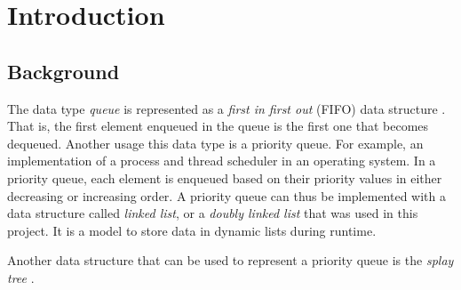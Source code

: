 \documentclass[a4paper,11pt]{kth-mag}
\begin{document}
\chapter{Introduction}

\section{Background}
The data type \emph{queue} is represented as a \emph{first in first out} (FIFO) data structure \cite{deshpande2004c}.
That is, the first element enqueued in the queue is the first one that becomes dequeued.
Another usage this data type is a priority queue.
For example, an implementation of a process and thread scheduler in an operating system.
In a priority queue, each element is enqueued based on their priority values in either decreasing or increasing order.
A priority queue can thus be implemented with a data structure called \emph{linked list}, or a \emph{doubly linked list} that was used in this project.
It is a model to store data in dynamic lists during runtime.

Another data structure that can be used to represent a priority queue is the \emph{splay tree} \cite{sleator1985self}.


\end{document}
